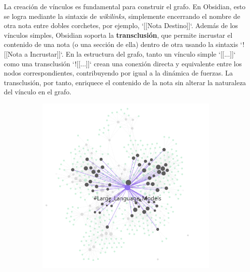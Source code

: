 La creación de vínculos es fundamental para construir el grafo. En Obsidian, esto se logra mediante la sintaxis de \textit{wikilinks}, simplemente encerrando el nombre de otra nota entre dobles corchetes, por ejemplo, `[[Nota Destino]]`. Además de los vínculos simples, Obsidian soporta la \textbf{transclusión}, que permite incrustar el contenido de una nota (o una sección de ella) dentro de otra usando la sintaxis `![[Nota a Incrustar]]`. En la estructura del grafo, tanto un vínculo simple `[[...]]` como una transclusión `![[...]]` crean una conexión directa y equivalente entre los nodos correspondientes, contribuyendo por igual a la dinámica de fuerzas. La transclusión, por tanto, enriquece el contenido de la nota sin alterar la naturaleza del vínculo en el grafo.

\begin{figure}[h!]
    \centering
    \begin{subfigure}[b]{0.48\textwidth}
        \centering
        \includegraphics[width=\textwidth]{figures/LLM_tag_graph.png}
        \label{fig:llm_tag}
    \end{subfigure}
    \hfill
    \begin{subfigure}[b]{0.48\textwidth}
        \centering

\end{subfigure}
\end{figure}
